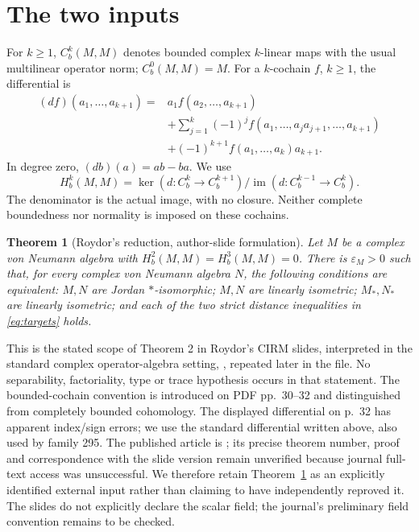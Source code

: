 \documentclass[11pt]{article}
\newtheorem{theorem}{Theorem}
\newcommand{\Cb}{C_b}
\newcommand{\Hb}{H_b}
\begin{document}
\section{The two inputs}

For $k\ge1$, $\Cb^k(M,M)$ denotes bounded complex $k$-linear maps
with the usual multilinear operator norm; $\Cb^0(M,M)=M$. For a
$k$-cochain $f$, $k\ge1$, the differential is
\begin{align*}
 (df)(a_1,\ldots,a_{k+1})={}&a_1f(a_2,\ldots,a_{k+1})\\
 &+\sum_{j=1}^k(-1)^j
 f(a_1,\ldots,a_ja_{j+1},\ldots,a_{k+1})\\
 &+(-1)^{k+1}f(a_1,\ldots,a_k)a_{k+1}.
\end{align*}
In degree zero, $(db)(a)=ab-ba$. We use
\[
 \Hb^k(M,M)=\ker(d:\Cb^k\to\Cb^{k+1})/
 \operatorname{im}(d:\Cb^{k-1}\to\Cb^k).
\]
The denominator is the actual image, with no closure. Neither
complete boundedness nor normality is imposed on these cochains.

\begin{theorem}[Roydor's reduction, author-slide formulation]\label{thm:roydor}
Let $M$ be a complex von Neumann algebra with
$\Hb^2(M,M)=\Hb^3(M,M)=0$. There is $\varepsilon_M>0$ such that,
for every complex von Neumann algebra $N$, the following conditions
are equivalent: $M,N$ are Jordan $*$-isomorphic; $M,N$ are linearly
isometric; $M_*,N_*$ are linearly isometric; and each of the two
strict distance inequalities in \eqref{eq:targets} holds.
\end{theorem}

This is the stated scope of Theorem 2 in Roydor's CIRM slides,
interpreted in the standard complex operator-algebra setting,
\cite[PDF pp.~28--29]{RoydorSlides}, repeated later in the file. No
separability, factoriality, type or trace hypothesis occurs in that
statement. The bounded-cochain convention is introduced on PDF
pp.~30--32 and distinguished from completely bounded cohomology.
The displayed differential on p.~32 has apparent index/sign errors;
we use the standard differential written above, also used by family
295. The published article is \cite{Roydor2022}; its precise theorem
number, proof and correspondence with the slide version remain
unverified because journal full-text access was unsuccessful. We
therefore retain Theorem~\ref{thm:roydor} as an explicitly identified
external input rather than claiming to have independently reproved it.
The slides do not explicitly declare the scalar field; the journal's
preliminary field convention remains to be checked.
\end{document}
